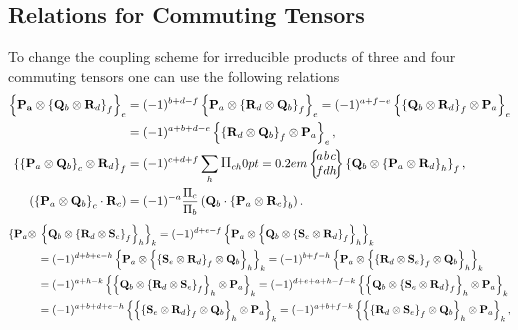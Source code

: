 \subsection{Relations for Commuting Tensors}\label{sec:3.3.2}
To change the coupling scheme for irreducible products of three and four commuting tensors one can use the following relations
\begin{align}
\left\{\vect{P}_{\vect{a}} \otimes\left\{\vect{Q}_{b} \otimes \vect{R}_{d}\right\}_{f}\right\}_{e} & =(-1)^{b+d-f}\left\{\vect{P}_{a} \otimes\left\{\vect{R}_{d} \otimes \vect{Q}_{b}\right\}_{f}\right\}_{e}=(-1)^{a+f-e}\left\{\left\{\vect{Q}_{b} \otimes \vect{R}_{d}\right\}_{f} \otimes \vect{P}_{a}\right\}_{e}  \notag\\
& =(-1)^{a+b+d-e}\left\{\left\{\vect{R}_{d} \otimes \vect{Q}_{b}\right\}_{f} \otimes \vect{P}_{a}\right\}_{e}, \label{eq:3:3:7}\\
\left\{\left\{\vect{P}_{a} \otimes \vect{Q}_{b}\right\}_{c} \otimes \vect{R}_{d}\right\}_{f}&=(-1)^{c+d+f} \sum_{h} \Fact{c h}\sixj{a }{ b }{ c }{f }{ d }{ h}\left\{\vect{Q}_{b} \otimes\left\{\vect{P}_{a} \otimes \vect{R}_{d}\right\}_{h}\right\}_{f},  \label{eq:3:3:8}\\
\left(\left\{\vect{P}_{a} \otimes \vect{Q}_{b}\right\}_{c} \cdot \vect{R}_{c}\right)&=(-1)^{-a} \frac{\Fact{c}}{\Fact{b}}\left(\vect{Q}_{b} \cdot\left\{\vect{P}_{a} \otimes \vect{R}_{c}\right\}_{b}\right) .\label{eq:3:3:9}
\end{align}
\begin{align}
\left\{\mathbf{P}_{a} \otimes\right. & \left.\left\{\mathbf{Q}_{b} \otimes\left\{\mathbf{R}_{d} \otimes \mathbf{S}_{e}\right\}_{f}\right\}_{h}\right\}_{k}=(-1)^{d+e-f}\left\{\mathbf{P}_{a} \otimes\left\{\mathbf{Q}_{b} \otimes\left\{\mathbf{S}_{e} \otimes \mathbf{R}_{d}\right\}_{f}\right\}_{h}\right\}_{k}  \notag\\
& =(-1)^{d+b+e-h}\left\{\mathbf{P}_{a} \otimes\left\{\left\{\mathbf{S}_{e} \otimes \mathbf{R}_{d}\right\}_{f} \otimes \mathbf{Q}_{b}\right\}_{h}\right\}_{k}=(-1)^{b+f-h}\left\{\mathbf{P}_{a} \otimes\left\{\left\{\mathbf{R}_{d} \otimes \mathbf{S}_{e}\right\}_{f} \otimes \mathbf{Q}_{b}\right\}_{h}\right\}_{k}  \notag\\
& =(-1)^{a+h-k}\left\{\left\{\mathbf{Q}_{b} \otimes\left\{\mathbf{R}_{d} \otimes \mathbf{S}_{e}\right\}_{f}\right\}_{h} \otimes \mathbf{P}_{a}\right\}_{k}=(-1)^{d+e+a+h-f-k}\left\{\left\{\mathbf{Q}_{b} \otimes\left\{\mathbf{S}_{e} \otimes \mathbf{R}_{d}\right\}_{f}\right\}_{h} \otimes \mathbf{P}_{a}\right\}_{k}  \notag\\
& =(-1)^{a+b+d+e-h}\left\{\left\{\left\{\mathbf{S}_{e} \otimes \mathbf{R}_{d}\right\}_{f} \otimes \mathbf{Q}_{b}\right\}_{h} \otimes \mathbf{P}_{a}\right\}_{k}=(-1)^{a+b+f-k}\left\{\left\{\left\{\mathbf{R}_{d} \otimes \mathbf{S}_{e}\right\}_{f} \otimes \mathbf{Q}_{b}\right\}_{h} \otimes \mathbf{P}_{a}\right\}_{k}, \label{eq:3:3:10}
\end{align}
